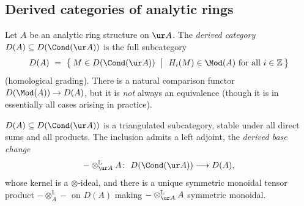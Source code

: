 \subsection{Derived categories of analytic rings}

\begin{definition}
\label{def:8:derived-cat}
Let $A$ be an analytic ring structure on $\ur A$. The \emph{derived category}
$D(A)\subseteq D(\Cond(\ur A))$ is the full subcategory
\begin{equation*}
D(A)\ =\ \bigl\{\, M\in D(\Cond(\ur A))\ \bigm|\ H_{i}(M)\in\Mod(A)\ \text{for all }i\in\mathbb{Z}\,\bigr\}
\end{equation*}
(homological grading). There is a natural comparison functor
$D(\Mod(A))\to D(A)$, but it is \emph{not} always an equivalence (though it is in
essentially all cases arising in practice).
\end{definition}

\begin{proposition}[Structure of $D(A)$]
\label{prop:8:D-triangulated}
$D(A)\subseteq D(\Cond(\ur A))$ is a triangulated subcategory, stable under all
direct sums and all products. The inclusion admits a left adjoint, the
\emph{derived base change}
\begin{equation*}
-\otimes^{\mathbb{L}}_{\ur A}A\colon\ D(\Cond(\ur A))\longrightarrow D(A),
\end{equation*}
whose kernel is a $\otimes$-ideal, and there is a unique symmetric monoidal
tensor product $-\otimes^{\mathbb{L}}_{A}-$ on $D(A)$ making
$-\otimes^{\mathbb{L}}_{\ur A}A$ symmetric monoidal.
\end{proposition}

